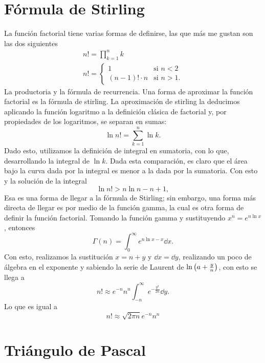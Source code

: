 \documentclass[conference]{IEEEtran}
\begin{document}
\section{Fórmula de Stirling}
La función factorial tiene varias formas de definirse, las que más me gustan son las dos siguientes
	\begin{equation}
		\begin{array}{c}
			n! = \displaystyle\prod _{k = 1} ^n k \\
			n! = \left\{\begin{array}{lr}
				1 & \text{si } n < 2 \\
				(n - 1)! \cdot n & \text{si } n > 1.
			\end{array}\right.
		\end{array}
	\end{equation}
	La productoria y la fórmula de recurrencia. Una forma de aproximar la función factorial es la fórmula de stirling. La aproximación de stirling la deducimos aplicando la función logaritmo a la definición clásica de factorial y, por propiedades de los logaritmos, se separan en sumas:
	\begin{equation*}
		\ln{n!} = \sum _{k = 1} ^n \ln{k} .
	\end{equation*}
	Dado esto, utilizamos la definición de integral en sumatoria, con lo que, desarrollando la integral de $\ln{k}$. Dada esta comparación, es claro que el área bajo la curva dada por la integral es menor a la dada por la sumatoria. Con esto y la solución de la integral
	\begin{equation*}
		\ln{n!} > n\ln{n} - n + 1,
	\end{equation*}
	Esa es una forma de llegar a la fórmula de Stirling; sin embargo, una forma más directa de llegar es por medio de la función gamma, la cual es otra forma de definir la función factorial. Tomando la función gamma y sustituyendo $x^n = e^{n\ln{x}}$, entonces
		$$\Gamma (n) = \int _{0} ^\infty e^{n\ln{x} - x} \dd{x}.$$
	Con esto, realizamos la sustitución $x = n + y$ y $\dd{x} = \dd{y}$, realizando un poco de álgebra en el exponente y sabiendo la serie de Laurent de $\ln{\qty(a + \frac{y}{n})}$, con esto se llega a 
		$$n! \approx e^{-n} n^n \int _{-n} ^{\infty} e^{-\frac{y^2}{2n}} \dd{y}.$$
	Lo que es igual a
		\begin{equation}
			\boxed{n! \approx \sqrt{2\pi n} e^{-n} n^n}
		\end{equation}
\section{Triángulo de Pascal}
\end{document}
